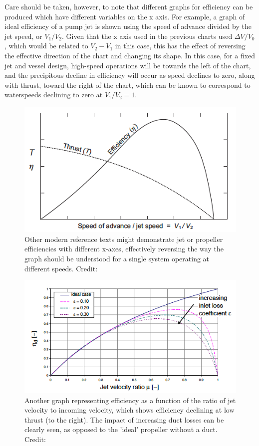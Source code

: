 \documentclass{article}\usepackage[]{graphicx}\usepackage[]{color}
\begin{document}
Care should be taken, however, to note that different graphs for efficiency can be produced which have different variables on the x axis.  For example, \cite[247]{mollard2011} a graph of ideal efficiency of a pump jet is shown using the speed of advance divided by the jet speed, or $V_1/V_2$.  Given that the x axis used in the previous charts used $\Delta V / V_0$, which would be related to $V_2-V_1$ in this case, this has the effect of reversing the effective direction of the chart and changing its shape. In this case, for a fixed jet and vessel design, high-speed operations will be towards the left of the chart, and the precipitous decline in efficiency will occur as speed declines to zero, along with thrust, toward the right of the chart, which can be known to correspond to waterspeeds declining to zero at $V_1/V_2=1$.

\begin{figure}
\includegraphics[width=\textwidth]{EfficiencyMollard.png}
\caption{Other modern reference texts might demonstrate jet or propeller efficiencies with different x-axes, effectively reversing the way the graph should be understood for a single system operating at different speeds. Credit:  \cite{mollard2011}}
\label{fig:EfficiencyMollard.png}
\end{figure}

\begin{figure}
\includegraphics[width=\textwidth]{EfficiencyBulten.png}
\caption{Another graph representing efficiency as a function of the ratio of jet velocity to incoming velocity, which shows efficiency declining at low thrust (to the right).  The impact of increasing duct losses can be clearly seen, as opposed to the 'ideal' propeller without a duct. Credit: \cite{bulten2006numerical}}
\label{fig:EfficiencyBulten.png}
\end{figure}
\end{document}
